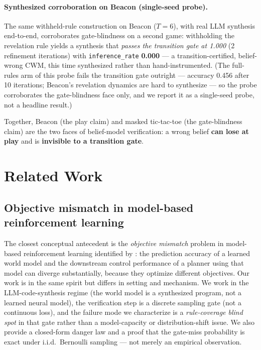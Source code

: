 \documentclass[11pt]{article}
\theoremstyle{remark}
\begin{document}
\paragraph{Synthesized corroboration on Beacon (single-seed probe).} The same withheld-rule construction on Beacon ($T=6$), with real LLM synthesis end-to-end, corroborates gate-blindness on a second game: withholding the revelation rule yields a synthesis that \emph{passes the transition gate at 1.000} (2 refinement iterations) with \texttt{inference\_rate} \textbf{0.000} --- a transition-certified, belief-wrong CWM, this time synthesized rather than hand-instrumented. (The full-rules arm of this probe fails the transition gate outright --- accuracy 0.456 after 10 iterations; Beacon's revelation dynamics are hard to synthesize --- so the probe corroborates the gate-blindness face only, and we report it as a single-seed probe, not a headline result.)

Together, Beacon (the play claim) and masked tic-tac-toe (the gate-blindness claim) are the two faces of belief-model verification: a wrong belief \textbf{can lose at play} and is \textbf{invisible to a transition gate}.

\section{Related Work}
\label{sec:related}

\subsection{Objective mismatch in model-based reinforcement learning}

The closest conceptual antecedent is the \emph{objective mismatch} problem in model-based reinforcement learning identified by \citet{lambert2020objective}: the prediction accuracy of a learned world model and the downstream control performance of a planner using that model can diverge substantially, because they optimize different objectives. Our work is in the same spirit but differs in setting and mechanism. We work in the LLM-code-synthesis regime (the world model is a synthesized program, not a learned neural model), the verification step is a discrete sampling gate (not a continuous loss), and the failure mode we characterize is a \emph{rule-coverage blind spot} in that gate rather than a model-capacity or distribution-shift issue. We also provide a closed-form danger law and a proof that the gate-miss probability is exact under i.i.d.\ Bernoulli sampling --- not merely an empirical observation.
\end{document}
